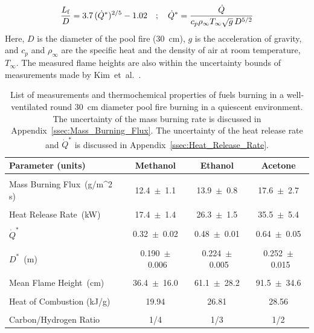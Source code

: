 \documentclass[12pt]{article}
\begin{document}
\begin{equation}
\frac{L_{\rm f}}{D} = 3.7 \, (\dot{Q}^*)^{2/5} - 1.02 \quad ; \quad \dot{Q}^*=\frac{\dot{Q}}{c_{p}\rho_\infty T_\infty \sqrt{g} \, D^{5/2}}
\end{equation}
Here, $D$ is the diameter of the pool fire (30~cm), $g$ is the acceleration of gravity, and $c_p$ and $\rho_\infty$ are the specific heat and the density of air at room temperature, $T_\infty$. The measured flame heights are also within the uncertainty bounds of measurements made by Kim~et~al.~\cite{Kim2019}.

\begin{table}[!t]
\caption[List of measurements and thermochemical properties of fuels]{List of measurements and thermochemical properties of fuels burning in a well-ventilated round 30~cm diameter pool fire burning in a quiescent environment. The uncertainty of the mass burning rate is discussed in Appendix~\ref{ssec:Mass_Burning_Flux}. The uncertainty of the heat release rate and $\dot{Q}^*$ is discussed in Appendix~\ref{ssec:Heat_Release_Rate}.}
\label{tab:Pool_Fire_Parameters_Table}
\centering
	\footnotesize
	\begin{tabular}{lccc}
\hline
\textbf{Parameter (units)} &\textbf{Methanol}& \textbf{Ethanol}& \textbf{Acetone}\\
\hline
\\[0.01cm]
Mass Burning Flux~(\si{g/{m^2 s}})		        	&	12.4~$\pm$~1.1		&	13.9~$\pm$~0.8		&	17.6~$\pm$~2.7		\\
\\[0.01cm]
Heat Release Rate~(\si{kW})		            	&	17.4~$\pm$~1.4		&	26.3~$\pm$~1.5		&	35.5~$\pm$~5.4		\\
\\[0.01cm]							
$\dot{Q}^* $						&	0.32~$\pm$~0.02		&	0.48~$\pm$~0.01		&	0.64~$\pm$~0.05		\\	
\\[0.01cm]
$D^*$~(\si{m})						&	0.190~$\pm$~0.006	&	0.224~$\pm$~0.005	&	0.252~$\pm$~0.015	\\
\\[0.01cm]
Mean Flame Height~(\si{cm})			           &	36.4~$\pm$~16.0		&	61.1~$\pm$~28.2		&	91.5~$\pm$~34.6		\\
\\[0.01cm]
Heat of Combustion (kJ/g)~\cite{SFPE}			&	19.94				&	26.81				&	28.56				\\	
\\[0.01cm]
Carbon/Hydrogen Ratio				         	&	1/4				&	1/3				&	1/2				\\
\hline
\end{tabular}
\end{table}
\end{document}
